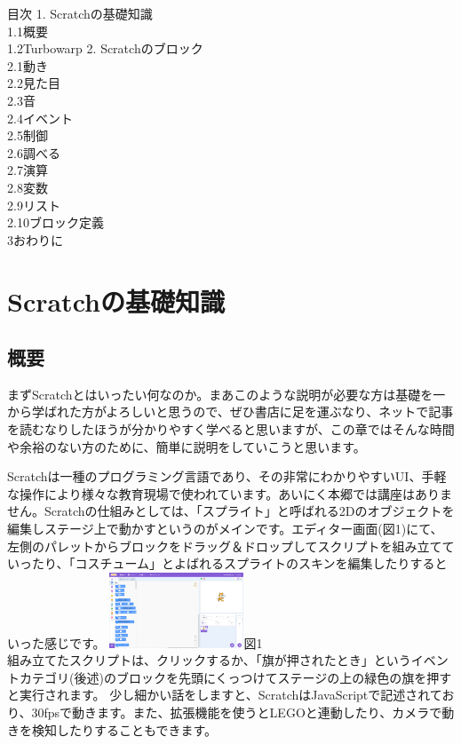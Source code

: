 \documentclass[b5paper,10pt]{jsarticle}
\begin{document}
\begin{multicols*}{3}
\begin{itembox}{目次}
{1. }Scratchの基礎知識\\
{ 1.1}概要\\
{ 1.2}Turbowarp
{2. }Scratchのブロック\\
{ 2.1}動き\\
{ 2.2}見た目\\
{ 2.3}音\\
{ 2.4}イベント\\
{ 2.5}制御\\
{ 2.6}調べる\\
{ 2.7}演算\\
{ 2.8}変数\\
{ 2.9}リスト\\
{ 2.10}ブロック定義\\
{3}おわりに
\end{itembox}

\section{Scratchの基礎知識}
\subsection{概要}
まずScratchとはいったい何なのか。まあこのような説明が必要な方は基礎を一から学ばれた方がよろしいと思うので、ぜひ書店に足を運ぶなり、ネットで記事を読むなりしたほうが分かりやすく学べると思いますが、この章ではそんな時間や余裕のない方のために、簡単に説明をしていこうと思います。

Scratchは一種のプログラミング言語であり、その非常にわかりやすいUI、手軽な操作により様々な教育現場で使われています。あいにく本郷では講座はありません。Scratchの仕組みとしては、「スプライト」と呼ばれる2Dのオブジェクトを編集しステージ上で動かすというのがメインです。エディター画面(図1)にて、左側のパレットからブロックをドラッグ＆ドロップしてスクリプトを組み立てていったり、「コスチューム」とよばれるスプライトのスキンを編集したりするといった感じです。
\includegraphics[width=4cm]{images/editor.png}図1\\
組み立てたスクリプトは、クリックするか、「旗が押されたとき」というイベントカテゴリ(後述)のブロックを先頭にくっつけてステージの上の緑色の旗を押すと実行されます。
少し細かい話をしますと、ScratchはJavaScriptで記述されており、30fpsで動きます。また、拡張機能を使うとLEGOと連動したり、カメラで動きを検知したりすることもできます。


\end{multicols*}
\end{document}
